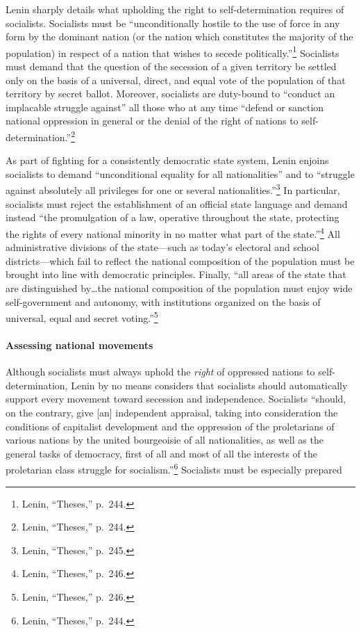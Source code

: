 Lenin sharply details what upholding the right to self-determination requires of socialists. Socialists must be ``unconditionally hostile to the use of force in any form by the dominant nation (or the nation which constitutes the majority of the population) in respect of a nation that wishes to secede politically.''\footnote{Lenin, ``Theses,'' p.\ 244.} Socialists must demand that the question of the secession of a given territory be settled only on the basis of a universal, direct, and equal vote of the population of that territory by secret ballot. Moreover, socialists are duty-bound to ``conduct an implacable struggle against'' all those who at any time ``defend or sanction national oppression in general or the denial of the right of nations to self-determination.''\footnote{Lenin, ``Theses,'' p.\ 244.}

As part of fighting for a consistently democratic state system, Lenin enjoins socialists to demand ``unconditional equality for all nationalities'' and to ``struggle against absolutely all privileges for one or several nationalities.''\footnote{Lenin, ``Theses,'' p.\ 245.} In particular, socialists must reject the establishment of an official state language and demand instead ``the promulgation of a law, operative throughout the state, protecting the rights of every national minority in no matter what part of the state.''\footnote{Lenin, ``Theses,'' p.\ 246.} All administrative divisions of the state---such as today's electoral and school districts---which fail to reflect the national composition of the population must be brought into line with democratic principles. Finally, ``all areas of the state that are distinguished by\ldots the national composition of the population must enjoy wide self-government and autonomy, with institutions organized on the basis of universal, equal and secret voting.''\footnote{Lenin, ``Theses,'' p.\ 246.}

\paragraph{Assessing national movements}

Although socialists must always uphold the \emph{right} of oppressed nations to self-determination, Lenin by no means considers that socialists should automatically support every movement toward secession and independence. Socialists ``should, on the contrary, give [an] independent appraisal, taking into consideration the conditions of capitalist development and the oppression of the proletarians of various nations by the united bourgeoisie of all nationalities, as well as the general tasks of democracy, first of all and most of all the interests of the proletarian class struggle for socialism.''\footnote{Lenin, ``Theses,'' p.\ 244.} Socialists must be especially prepared

